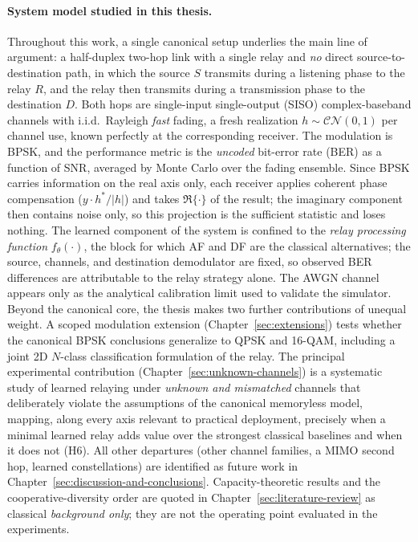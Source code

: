 \paragraph{System model studied in this thesis.}
Throughout this work, a single canonical setup underlies the main line of argument: a half-duplex two-hop link with a single relay and \emph{no} direct source-to-destination path, in which the source $S$ transmits during a listening phase to the relay $R$, and the relay then transmits during a transmission phase to the destination $D$. Both hops are single-input single-output (SISO) complex-baseband channels with i.i.d.\ Rayleigh \emph{fast} fading, a fresh realization $h\sim\mathcal{CN}(0,1)$ per channel use, known perfectly at the corresponding receiver. The modulation is BPSK, and the performance metric is the \emph{uncoded} bit-error rate (BER) as a function of SNR, averaged by Monte Carlo over the fading ensemble. Since BPSK carries information on the real axis only, each receiver applies coherent phase compensation ($y \cdot h^*/|h|$) and takes $\Re\{\cdot\}$ of the result; the imaginary component then contains noise only, so this projection is the sufficient statistic and loses nothing. The learned component of the system is confined to the \emph{relay processing function} $f_\theta(\cdot)$, the block for which AF and DF are the classical alternatives; the source, channels, and destination demodulator are fixed, so observed BER differences are attributable to the relay strategy alone. The AWGN channel appears only as the analytical calibration limit used to validate the simulator. Beyond the canonical core, the thesis makes two further contributions of unequal weight. A scoped modulation extension (Chapter~\ref{sec:extensions}) tests whether the canonical BPSK conclusions generalize to QPSK and 16-QAM, including a joint 2D $N$-class classification formulation of the relay. The principal experimental contribution (Chapter~\ref{sec:unknown-channels}) is a systematic study of learned relaying under \emph{unknown and mismatched} channels that deliberately violate the assumptions of the canonical memoryless model, mapping, along every axis relevant to practical deployment, precisely when a minimal learned relay adds value over the strongest classical baselines and when it does not (H6). All other departures (other channel families, a MIMO second hop, learned constellations) are identified as future work in Chapter~\ref{sec:discussion-and-conclusions}. Capacity-theoretic results and the cooperative-diversity order are quoted in Chapter~\ref{sec:literature-review} as classical \emph{background only}; they are not the operating point evaluated in the experiments.

